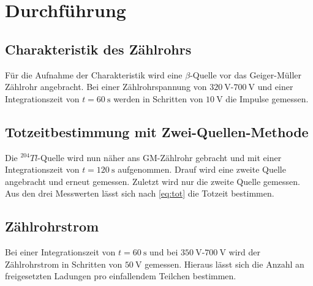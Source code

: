 \section{Durchführung}
\label{sec:Durchführung}

\subsection{Charakteristik des Zählrohrs}
Für die Aufnahme der Charakteristik wird eine $\beta$-Quelle vor das Geiger-Müller Zählrohr angebracht.
Bei einer Zählrohrspannung von $\SI{320}{\volt}$-$\SI{700}{\volt}$ und einer Integrationszeit von $t=\SI{60}{\second}$ werden in Schritten von $\SI{10}{\volt}$ die Impulse gemessen.
\subsection{Totzeitbestimmung mit Zwei-Quellen-Methode}
Die $^{204}Tl$-Quelle wird nun näher ans GM-Zählrohr gebracht und mit einer Integrationszeit von $t=\SI{120}{\second}$ aufgenommen.
Drauf wird eine zweite Quelle angebracht und erneut gemessen. 
Zuletzt wird nur die zweite Quelle gemessen.
Aus den drei Messwerten lässt sich nach \autoref{eq:tot} die Totzeit bestimmen.
\subsection{Zählrohrstrom} 
Bei einer Integrationszeit von $t=\SI{60}{\second}$ und bei $\SI{350}{\volt}$-$\SI{700}{\volt}$ wird der Zählrohrstrom in Schritten von $\SI{50}{\volt}$ gemessen.
Hieraus lässt sich die Anzahl an freigesetzten Ladungen pro einfallendem Teilchen bestimmen.